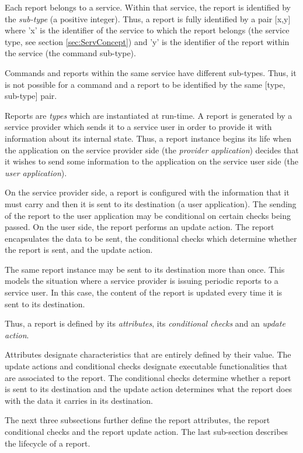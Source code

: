 Each report belongs to a service. Within that service, the report is identified by the \textit{sub-type} (a positive integer). Thus, a report is fully identified by a pair [x,y] where 'x' is the identifier of the service to which the report belongs (the service type, see section \ref{sec:ServConcept}) and 'y' is the identifier of the report within the service (the command sub-type).

Commands and reports within the same service have different sub-types. Thus, it is not possible for a command and a report to be identified by the same [type, sub-type] pair.  

Reports are \textit{types} which are instantiated at run-time. A report is generated by a service provider which sends it to a service user in order to provide it with information about its internal state. Thus, a report instance begins its life when the application on the service provider side (the \textit{provider application}) decides that it wishes to send some information to the application on the service user side (the \textit{user application}). 

On the service provider side, a report is configured with the information that it must carry and then it is sent to its destination (a user application). The sending of the report to the user application may be conditional on certain checks being passed. On the user side, the report performs an update action. The report encapsulates the data to be sent, the conditional checks which determine whether the report is sent, and the update action.  

The same report instance may be sent to its destination more than once. This models the situation where a service provider is issuing periodic reports to a service user. In this case, the content of the report is updated every time it is sent to its destination. 

Thus, a report is defined by its \textit{attributes}, its \textit{conditional checks} and an \textit{update action}. 

Attributes designate characteristics that are entirely defined by their value. The update actions and conditional checks designate executable functionalities that are associated to the report. The conditional checks determine whether a report is sent to its destination and the update action determines what the report does with the data it carries in its destination.

The next three subsections further define the report attributes, the report conditional checks and the report update action. The last sub-section describes the lifecycle of a report. 

